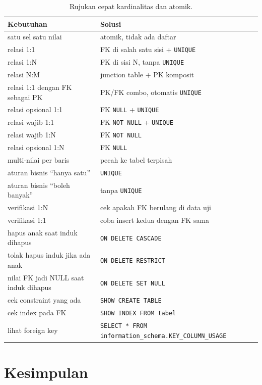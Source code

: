 \documentclass[11pt,a4paper]{article}
\begin{document}
\begin{table}[H]
	\centering
	\caption{Rujukan cepat kardinalitas dan atomik.}
	\label{tab:cheat}
	\scriptsize
	\setlength{\tabcolsep}{4pt}
	\renewcommand{\arraystretch}{1.15}
	\begin{tabularx}{\textwidth}{>{\raggedright\arraybackslash}X >{\raggedright\arraybackslash}X}
		\toprule
		Kebutuhan & Solusi \\
		\midrule
		satu sel satu nilai & atomik, tidak ada daftar \\
		relasi 1:1 & FK di salah satu sisi + \texttt{UNIQUE} \\
		relasi 1:N & FK di sisi N, tanpa \texttt{UNIQUE} \\
		relasi N:M & junction table + PK komposit \\
		relasi 1:1 dengan FK sebagai PK & PK/FK combo, otomatis \texttt{UNIQUE} \\
		relasi opsional 1:1 & FK \texttt{NULL} + \texttt{UNIQUE} \\
		relasi wajib 1:1 & FK \texttt{NOT NULL} + \texttt{UNIQUE} \\
		relasi wajib 1:N & FK \texttt{NOT NULL} \\
		relasi opsional 1:N & FK \texttt{NULL} \\
		multi-nilai per baris & pecah ke tabel terpisah \\
		aturan bisnis ``hanya satu'' & \texttt{UNIQUE} \\
		aturan bisnis ``boleh banyak'' & tanpa \texttt{UNIQUE} \\
		verifikasi 1:N & cek apakah FK berulang di data uji \\
		verifikasi 1:1 & coba insert kedua dengan FK sama \\
		hapus anak saat induk dihapus & \texttt{ON DELETE CASCADE} \\
		tolak hapus induk jika ada anak & \texttt{ON DELETE RESTRICT} \\
		nilai FK jadi NULL saat induk dihapus & \texttt{ON DELETE SET NULL} \\
		cek constraint yang ada & \texttt{SHOW CREATE TABLE} \\
		cek index pada FK & \texttt{SHOW INDEX FROM tabel} \\
		lihat foreign key & \texttt{SELECT * FROM information\_schema.KEY\_COLUMN\_USAGE} \\
		\bottomrule
	\end{tabularx}
\end{table}

\section{Kesimpulan}
\end{document}
